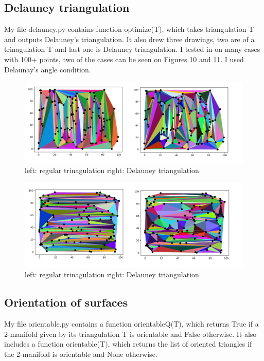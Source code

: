 \documentclass[12pt]{article}
\begin{document}
	\subsection{Delauney triangulation}
	My file delauney.py contains function optimize(T), which takes triangulation T and outputs Delauney's triangulation. It also drew three drawings, two are of a trinagulation T and last one is Delauney triangulation. I tested in on many cases with 100+ points, two of the cases can be seen on Figures 10 and 11. I used Delaunay's angle condition.
	
	\begin{figure}
		\centering
		\includegraphics[scale=0.5] {graf10}
		\caption{\label{fig:10} left: regular trinagulation right: Delauney triangulation}
	\end{figure}
	
	\begin{figure}
		\centering
		\includegraphics[scale=0.5] {graf11}
		\caption{\label{fig:11} left: regular trinagulation right: Delauney triangulation }
	\end{figure}
	 
	\subsection{Orientation of surfaces}
	My file orientable.py contains a function orientableQ(T), which returns True if
	a 2-manifold given by its triangulation T is orientable and False otherwise. It also includes a function orientable(T), which returns the list of oriented triangles if the 2-manifold is orientable and None otherwise. \\
	
\end{document}
